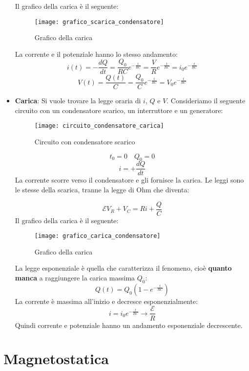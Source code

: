 \documentclass[a4paper]{article}
\begin{document}
\begin{itemize}
\begin{definition}
    Il grafico della carica è il seguente:
    \begin{figure}[H]
      \centering
      \texttt{[image: grafico\_scarica\_condensatore]}
      \caption{Grafico della carica}
    \end{figure}
    \noindent
    La corrente e il potenziale hanno lo stesso andamento:
    \[
      i(t) = -\frac{dQ}{dt} = \frac{Q_0}{RC} e^{-\frac{t}{RC}} = \frac{V}{R} e^{-\frac{t}{RC}} = i_0 e^{-\frac{t}{RC}}
    \] 
    \[
      V(t) = \frac{Q(t)}{C} = \frac{Q_0}{C} e^{-\frac{t}{RC}} = V_0 e^{-\frac{t}{RC}}
    \] 
    \end{definition}

  \item \textbf{Carica}: Si vuole trovare la legge oraria di \( i \), \( Q \) e \( V \).
    Consideriamo il seguente circuito con un condensatore scarico, un interruttore e
    un generatore:
    \begin{figure}[H]
      \centering
      \texttt{[image: circuito\_condensatore\_carica]}
      \caption{Circuito con condensatore scarico}
    \end{figure}
    \[
      t_0 = 0 \quad Q_0 = 0
    \] 
    \[
      i = + \frac{dQ}{dt}
    \] 
    La corrente scorre verso il condensatore e gli fornisce la carica. Le leggi sono le
    stesse della scarica, tranne la legge di Ohm che diventa:
    \begin{definition}
      \[
        \mathcal{E} V_R + V_C = Ri + \frac{Q}{C}
      \] 
      Il grafico della carica è il seguente:
      \begin{figure}[H]
        \centering
        \texttt{[image: grafico\_carica\_condensatore]}
        \caption{Grafico della carica}
      \end{figure}
      \noindent
      La legge esponenziale è quella che caratterizza il fenomeno, cioè \textbf{quanto
      manca} a raggiungere la carica massima \( Q_0 \):
      \[
        Q(t) = Q_0 \left( 1 - e^{-\frac{t}{RC}} \right)
      \]
      La corrente è massima all'inizio e decresce esponenzialmente:
      \[
        i = i_0 e^{-\frac{t}{RC}} \to \frac{\mathcal{E}}{R}
      \] 
      Quindi corrente e potenziale hanno un andamento esponenziale decrescente.
    \end{definition}
\end{itemize}

\section{Magnetostatica}
\end{document}
